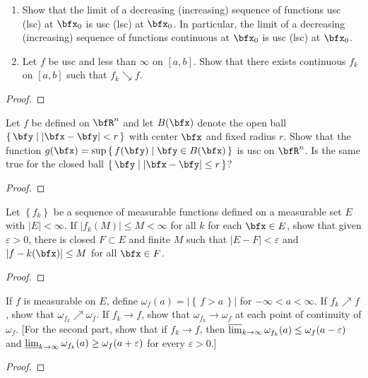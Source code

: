 \begin{problem}
\begin{enumerate}[label=(\alph*)]
\item Show that the limit of a decreasing (increasing) sequence of
  functions usc (lsc) at $\bfx_0$ is usc (lsc) at $\bfx_0$. In particular,
  the limit of a decreasing (increasing) sequence of functions continuous
  at $\bfx_0$ is usc (lsc) at $\bfx_0$.
\item Let $f$ be usc and less than $\infty$ on $[a,b]$. Show that there
  exists continuous $f_k$ on $[a,b]$ such that $f_k\searrow f$.
\end{enumerate}
\end{problem}
\begin{proof}
\end{proof}
\newpage


\begin{problem}
Let $f$ be defined on $\bfR^n$ and let $B(\bfx)$ denote the open ball
$\left\{\,\bfy\;\middle|\;\left|\bfx-\bfy\right|<r\,\right\}$ with center
$\bfx$ and fixed radius $r$. Show that the function
$g(\bfx)=\sup\left\{\,f(\bfy)\;\middle|\;\bfy\in B(\bfx)\,\right\}$ is usc
on $\bfR^n$. Is the same true for the closed ball
$\left\{\,\bfy\;\middle|\;\left|\bfx-\bfy\right|\leq r\,\right\}$?
\end{problem}
\begin{proof}
\end{proof}
\newpage

\begin{problem}
Let $\left\{f_k\right\}$ be a sequence of measurable functions defined on a
measurable set $E$ with $|E|<\infty$. If $|f_k(M)|\leq M<\infty$ for all
$k$ for each $\bfx\in E$, show that given $\varepsilon>0$, there is closed
$F\subset E$ and finite $M$ such that $|E\minus F|<\varepsilon$ and
$|f-k(\bfx)|\leq M$ for all $\bfx\in F$.
\end{problem}
\begin{proof}
\end{proof}
\newpage

\begin{problem}
If $f$ is measurable on $E$, define
$\omega_f(a)=\left|\left\{\,f>a\,\right\}\right|$ for
$-\infty<a<\infty$. If $f_k\nearrow f$, show that
$\omega_{f_k}\nearrow\omega_f$. If $f_k\to f$, show that
$\omega_{f_k}\to\omega_f$ at each point of continuity of $\omega_f$. [For
the second part, show that if $f_k\to f$, then
$\varlimsup_{k\to\infty}\omega_{f_k}(a)\leq\omega_f(a-\varepsilon)$ and
$\varliminf_{k\to\infty}\omega_{f_k}(a)\geq\omega_f(a+\varepsilon)$ for every
$\varepsilon>0$.]
\end{problem}
\begin{proof}
\end{proof}
\newpage

